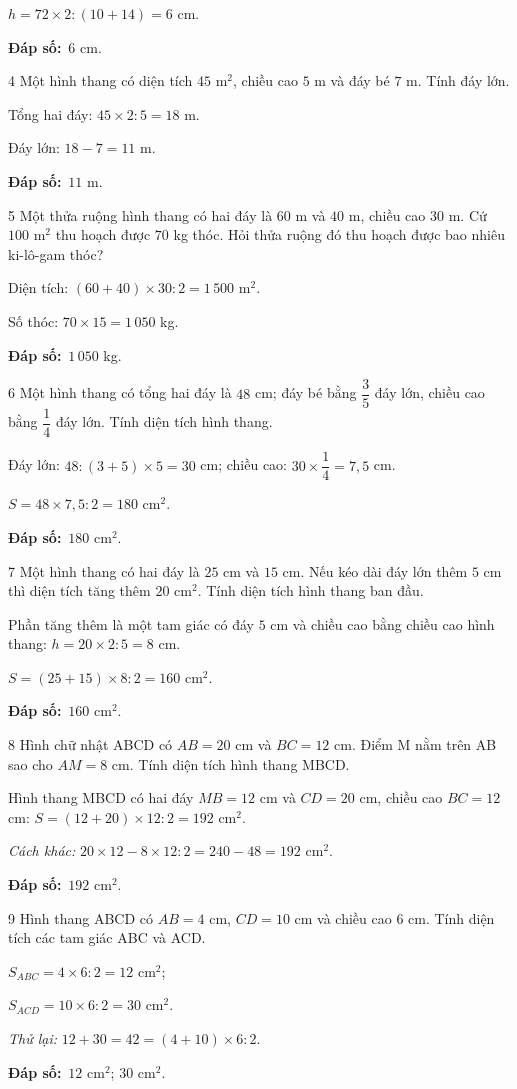 \documentclass[11pt]{article}
\newif\ifsol \solfalse
\providecommand{\AnsWord}{Đáp số}
\newcommand{\dapso}[1]{\par\textbf{\AnsWord:}\ #1}
\newcommand{\probsol}[1]{%
  \begin{lrbox}{\solmeasure}\begin{minipage}{\dimexpr\linewidth-24pt\relax}#1\end{minipage}\end{lrbox}%
  \ifsol
    \begin{solbox}#1\end{solbox}%
  \else
    \setlength{\solht}{\dimexpr\ht\solmeasure+\dp\solmeasure+0.85cm\relax}%
    \ifdim\solht<1.35cm\setlength{\solht}{1.35cm}\fi
    \begin{tcolorbox}[colback=white,colframe=Line,boxrule=0.8pt,arc=5pt,
      left=8pt,right=8pt,top=4pt,bottom=4pt,height=\solht]{\footnotesize\color{Slate}\itshape\WorkWord}\end{tcolorbox}%
  \fi}
\newcommand{\gap}{\vspace{0.3cm}}
\def\WorkWord{Bài làm:}
\def\AnsWord{Đáp số}
\begin{document}
\probsol{
$h=72\times2:(10+14)=6$ cm.
\dapso{$6$ cm.}}
\gap
\begin{probbox}{4}{\relax}
Một hình thang có diện tích $45$ m$^2$, chiều cao $5$ m và đáy bé $7$ m. Tính đáy lớn.
\end{probbox}
\probsol{
Tổng hai đáy: $45\times2:5=18$ m.\par Đáy lớn: $18-7=11$ m.
\dapso{$11$ m.}}
\gap
\begin{probbox}{5}{\relax}
Một thửa ruộng hình thang có hai đáy là $60$ m và $40$ m, chiều cao $30$ m. Cứ $100$ m$^2$ thu hoạch được $70$ kg thóc. Hỏi thửa ruộng đó thu hoạch được bao nhiêu ki-lô-gam thóc?
\end{probbox}
\probsol{
Diện tích: $(60+40)\times30:2=1\,500$ m$^2$.\par Số thóc: $70\times15=1\,050$ kg.
\dapso{$1\,050$ kg.}}
\gap
\begin{probbox}{6}{\relax}
Một hình thang có tổng hai đáy là $48$ cm; đáy bé bằng $\dfrac35$ đáy lớn, chiều cao bằng $\dfrac14$ đáy lớn. Tính diện tích hình thang.
\end{probbox}
\probsol{
Đáy lớn: $48:(3+5)\times5=30$ cm; chiều cao: $30\times\dfrac14=7{,}5$ cm.\par $S=48\times7{,}5:2=180$ cm$^2$.
\dapso{$180$ cm$^2$.}}
\gap
\begin{probbox}{7}{\relax}
Một hình thang có hai đáy là $25$ cm và $15$ cm. Nếu kéo dài đáy lớn thêm $5$ cm thì diện tích tăng thêm $20$ cm$^2$. Tính diện tích hình thang ban đầu.
\end{probbox}
\probsol{
Phần tăng thêm là một tam giác có đáy $5$ cm và chiều cao bằng chiều cao hình thang: $h=20\times2:5=8$ cm.\par $S=(25+15)\times8:2=160$ cm$^2$.
\dapso{$160$ cm$^2$.}}
\gap
\begin{probbox}{8}{\relax}
Hình chữ nhật ABCD có $AB=20$ cm và $BC=12$ cm. Điểm M nằm trên AB sao cho $AM=8$ cm. Tính diện tích hình thang MBCD.
\end{probbox}
\probsol{
Hình thang MBCD có hai đáy $MB=12$ cm và $CD=20$ cm, chiều cao $BC=12$ cm: $S=(12+20)\times12:2=192$ cm$^2$.\par
\emph{Cách khác:} $20\times12-8\times12:2=240-48=192$ cm$^2$.
\dapso{$192$ cm$^2$.}}
\gap
\begin{probbox}{9}{\relax}
Hình thang ABCD có $AB=4$ cm, $CD=10$ cm và chiều cao $6$ cm. Tính diện tích các tam giác ABC và ACD.
\end{probbox}
\probsol{
$S_{ABC}=4\times6:2=12$ cm$^2$;\par $S_{ACD}=10\times6:2=30$ cm$^2$.\par \emph{Thử lại:} $12+30=42=(4+10)\times6:2$.
\dapso{$12$ cm$^2$; $30$ cm$^2$.}}
\end{document}
